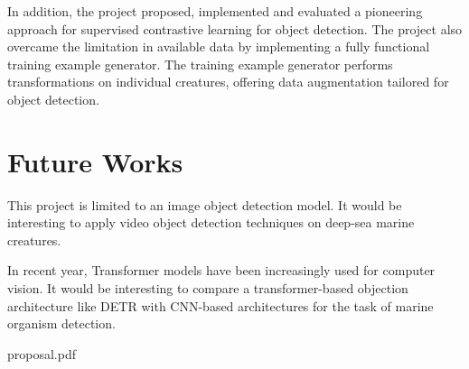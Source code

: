 \documentclass[12pt,a4paper,twoside,openany]{report}
\begin{document}
In addition, the project proposed, implemented and evaluated a pioneering approach for supervised contrastive learning for object detection. The project also overcame the limitation in available data by implementing a fully functional training example generator. The training example generator performs transformations on individual creatures, offering data augmentation tailored for object detection.

\section{Future Works}
This project is limited to an image object detection model. It would be interesting to apply video object detection techniques on deep-sea marine creatures.

In recent year, Transformer models have been increasingly used for computer vision. It would be interesting to compare a transformer-based objection architecture like DETR \cite{carion_end--end_2020} with CNN-based architectures for the task of marine organism detection.



\printbibliography[
heading=bibintoc,
title={Bibliography}
]

\appendix



     {proposal.pdf}
\end{document}
